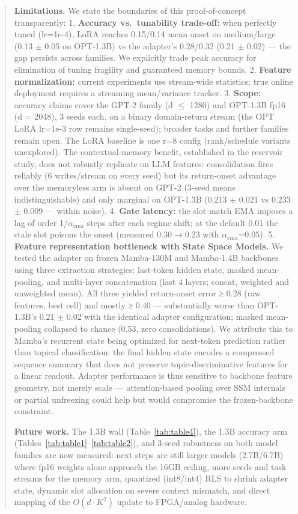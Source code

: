 \documentclass[11pt]{article}
\begin{document}
\begin{quote}
\textbf{Limitations.} We state the boundaries of this proof-of-concept transparently:
1. \textbf{Accuracy vs.~tunability trade-off:} when perfectly tuned (lr=1e-4), LoRA reaches 0.15/0.14 mean onset on medium/large (0.13 \(\pm\) 0.05 on OPT-1.3B) vs the adapter's 0.28/0.32 (0.21 \(\pm\) 0.02) --- the gap persists across families. We explicitly trade peak accuracy for elimination of tuning fragility and guaranteed memory bounds.
2. \textbf{Feature normalization:} current experiments use stream-wide statistics; true online deployment requires a streaming mean/variance tracker.
3. \textbf{Scope:} accuracy claims cover the GPT-2 family (d \(\leq\) 1280) and OPT-1.3B fp16 (d = 2048), 3 seeds each, on a binary domain-return stream (the OPT LoRA lr=1e-3 row remains single-seed); broader tasks and further families remain open. The LoRA baseline is one r=8 config (rank/schedule variants unexplored). The contextual-memory benefit, established in the reservoir study, does not robustly replicate on LLM features: consolidation fires reliably (6 writes/stream on every seed) but its return-onset advantage over the memoryless arm is absent on GPT-2 (3-seed means indistinguishable) and only marginal on OPT-1.3B (0.213 \(\pm\) 0.021 vs 0.233 \(\pm\) 0.009 --- within noise).
4. \textbf{Gate latency:} the slot-match EMA imposes a lag of order 1/\(\alpha_{\mathrm{ema}}\) steps after each regime shift; at the default 0.01 the stale slot poisons the onset (measured 0.30\(\to 0.23\) with \(\alpha_{\mathrm{ema}}\)=0.05).
5. \textbf{Feature representation bottleneck with State Space Models.} We tested the adapter on frozen Mamba-130M and Mamba-1.4B backbones using three extraction strategies: last-token hidden state, masked mean-pooling, and multi-layer concatenation (last 4 layers; concat, weighted and unweighted mean). All three yielded return-onset error ≥ 0.28 (raw features, best cell) and mostly ≥ 0.40 --- substantially worse than OPT-1.3B's 0.21 \(\pm\) 0.02 with the identical adapter configuration; masked mean-pooling collapsed to chance (0.53, zero consolidations). We attribute this to Mamba's recurrent state being optimized for next-token prediction rather than topical classification: the final hidden state encodes a compressed sequence summary that does not preserve topic-discriminative features for a linear readout. Adapter performance is thus sensitive to backbone feature geometry, not merely scale --- attention-based pooling over SSM internals or partial unfreezing could help but would compromise the frozen-backbone constraint.

\textbf{Future work.} The 1.3B wall (Table~\ref{tab:table4}), the 1.3B accuracy arm (Tables~\ref{tab:table1}--\ref{tab:table2}), and 3-seed robustness on both model families are now measured: next steps are still larger models (2.7B/6.7B) where fp16 weights alone approach the 16GB ceiling, more seeds and task streams for the memory arm, quantized (int8/int4) RLS to shrink adapter state, dynamic slot allocation on severe context mismatch, and direct mapping of the \(O(d\cdot K^2)\) update to FPGA/analog hardware.
\end{quote}
\end{document}
